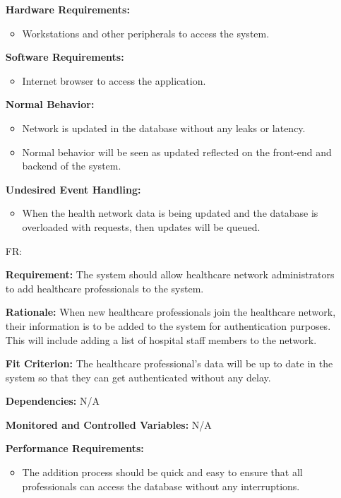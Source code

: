 \documentclass[12pt]{article}
\newcounter{reqnum} %
\begin{document}
\begin{itemize}
\textbf{Hardware Requirements:} 
\begin{itemize}
  \item Workstations and other peripherals to access the system.
\end{itemize}

\textbf{Software Requirements:} 
\begin{itemize}
  \item Internet browser to access the application.
\end{itemize}

\textbf{Normal Behavior:}
\begin{itemize}
  \item Network is updated in the database without any leaks or latency.
  \item Normal behavior will be seen as updated reflected on the front-end and backend of the system.
\end{itemize} 

\textbf{Undesired Event Handling:} 
\begin{itemize}
  \item When the health network data is being updated and the database is overloaded with requests, then updates will be queued.
\end{itemize}

\item[FR\refstepcounter{reqnum}\thereqnum \label{FR_AddHealthProfessional}:]

\textbf{Requirement:} The system should allow healthcare network administrators to add healthcare professionals to the system.

\textbf{Rationale:} When new healthcare professionals join the healthcare network, their information is to be added to the system for authentication purposes. This will include adding a list of hospital staff members to the network.

\textbf{Fit Criterion:} The healthcare professional’s data will be up to date in the system so that they can get authenticated without any delay. 

\textbf{Dependencies:} N/A 

\textbf{Monitored and Controlled Variables:} N/A

\textbf{Performance Requirements:} 
\begin{itemize}
  \item The addition process should be quick and easy to ensure that all professionals can access the database without any interruptions.
\end{itemize}


\end{itemize}
\end{document}
